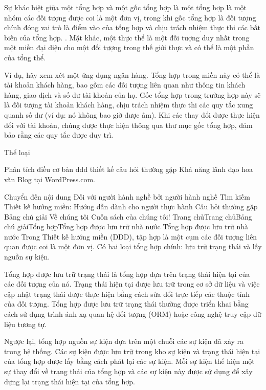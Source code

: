 Sự khác biệt giữa một tổng hợp và một gốc tổng hợp là một tổng hợp là một nhóm các đối tượng được coi là một đơn vị, trong khi gốc tổng hợp là đối tượng chính đóng vai trò là điểm vào của tổng hợp và chịu trách nhiệm thực thi các bất biến của tổng hợp. . Mặt khác, một thực thể là một đối tượng duy nhất trong một miền đại diện cho một đối tượng trong thế giới thực và có thể là một phần của tổng thể.

Ví dụ, hãy xem xét một ứng dụng ngân hàng. Tổng hợp trong miền này có thể là tài khoản khách hàng, bao gồm các đối tượng liên quan như thông tin khách hàng, giao dịch và số dư tài khoản của họ. Gốc tổng hợp trong trường hợp này sẽ là đối tượng tài khoản khách hàng, chịu trách nhiệm thực thi các quy tắc xung quanh số dư (ví dụ: nó không bao giờ được âm). Khi các thay đổi được thực hiện đối với tài khoản, chúng được thực hiện thông qua thư mục gốc tổng hợp, đảm bảo rằng các quy tắc được duy trì.


Thể loại

Phân tích
điều cơ bản
ddd
thiết kế
câu hỏi thường gặp
Khả năng lãnh đạo
hoa văn
Blog tại WordPress.com.









Chuyển đến nội dung
Đối với người hành nghề bởi người hành nghề
Tìm kiếm
Thiết kế hướng miền: Hướng dẫn dành cho người thực hành
Câu hỏi thường gặp
Bảng chú giải
Về chúng tôi
Cuốn sách của chúng tôi!
Trang chủTrang chủBảng chú giảiTổng hợpTổng hợp được lưu trữ nhà nước
Tổng hợp được lưu trữ nhà nước
Trong Thiết kế hướng miền (DDD), tập hợp là một cụm các đối tượng liên quan được coi là một đơn vị. Có hai loại tổng hợp chính: lưu trữ trạng thái và lấy nguồn sự kiện.

Tổng hợp được lưu trữ trạng thái là tổng hợp dựa trên trạng thái hiện tại của các đối tượng của nó. Trạng thái hiện tại được lưu trữ trong cơ sở dữ liệu và việc cập nhật trạng thái được thực hiện bằng cách sửa đổi trực tiếp các thuộc tính của đối tượng. Tổng hợp được lưu trữ trạng thái thường được triển khai bằng cách sử dụng trình ánh xạ quan hệ đối tượng (ORM) hoặc công nghệ truy cập dữ liệu tương tự.

Ngược lại, tổng hợp nguồn sự kiện dựa trên một chuỗi các sự kiện đã xảy ra trong hệ thống. Các sự kiện được lưu trữ trong kho sự kiện và trạng thái hiện tại của tổng hợp được lấy bằng cách phát lại các sự kiện. Mỗi sự kiện thể hiện một sự thay đổi về trạng thái của tổng hợp và các sự kiện này được sử dụng để xây dựng lại trạng thái hiện tại của tổng hợp.


